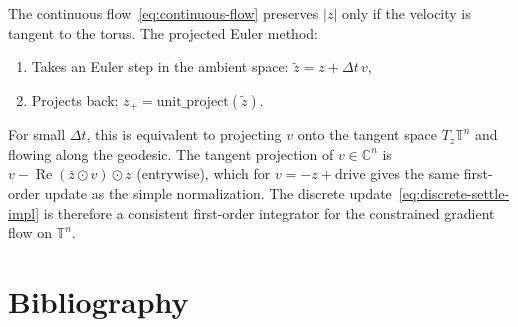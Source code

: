 \documentclass[11pt]{article}
\newcommand{\C}{\mathbb{C}}
\newcommand{\T}{\mathbb{T}}
\newcommand{\dt}{\Delta t}
\newcommand{\unitproject}{\mathrm{unit\_project}}
\DeclareMathOperator{\Real}{Re}
\begin{document}
The continuous flow~\eqref{eq:continuous-flow} preserves $|z|$ only if the velocity is tangent to the torus. The projected Euler method:
\begin{enumerate}
\item Takes an Euler step in the ambient space: $\tilde{z} = z + \dt\, v$,
\item Projects back: $z_+ = \unitproject(\tilde{z})$.
\end{enumerate}
For small $\dt$, this is equivalent to projecting $v$ onto the tangent space $T_z\T^n$ and flowing along the geodesic. The tangent projection of $v \in \C^n$ is $v - \Real(\bar{z} \odot v) \odot z$ (entrywise), which for $v = -z + \text{drive}$ gives the same first-order update as the simple normalization. The discrete update~\eqref{eq:discrete-settle-impl} is therefore a consistent first-order integrator for the constrained gradient flow on $\T^n$.

\section{Bibliography}\label{sec:bibliography}



\end{document}
